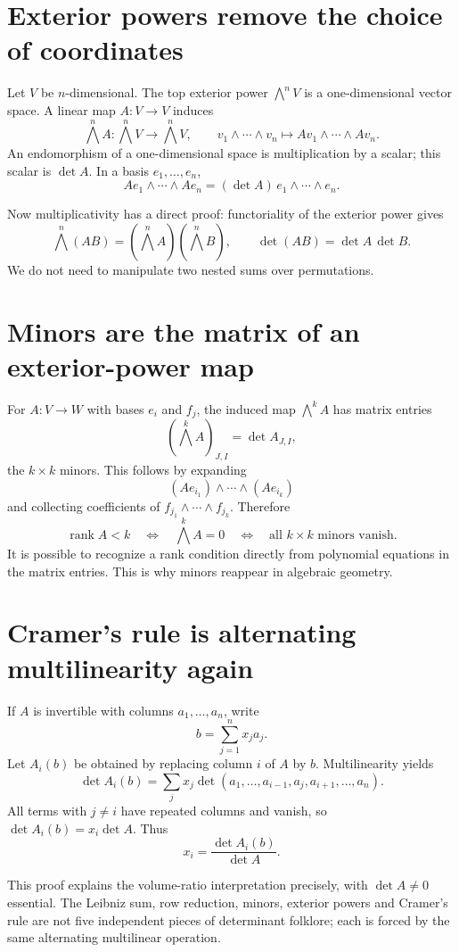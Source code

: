 \section{Exterior powers remove the choice of coordinates}

Let \(V\) be \(n\)-dimensional. The top exterior power \(\bigwedge^nV\) is a one-dimensional vector space. A linear map \(A:V\to V\) induces
\[
 \bigwedge^nA:\bigwedge^nV\longrightarrow\bigwedge^nV,
 \qquad
 v_1\wedge\cdots\wedge v_n\mapsto
 Av_1\wedge\cdots\wedge Av_n.
\]
An endomorphism of a one-dimensional space is multiplication by a scalar; this scalar is \(\det A\). In a basis \(e_1,\ldots,e_n\),
\[
 Ae_1\wedge\cdots\wedge Ae_n
 =(\det A)\,e_1\wedge\cdots\wedge e_n.
\]

Now multiplicativity has a direct proof: functoriality of the exterior power gives
\[
 \bigwedge^n(AB)=(\bigwedge^nA)(\bigwedge^nB),
 \qquad \det(AB)=\det A\,\det B.
\]
We do not need to manipulate two nested sums over permutations.

\section{Minors are the matrix of an exterior-power map}

For \(A:V\to W\) with bases \(e_i\) and \(f_j\), the induced map \(\bigwedge^k A\) has matrix entries
\[
 (\bigwedge^k A)_{J,I}=\det A_{J,I},
\]
the \(k\times k\) minors. This follows by expanding
\[
 (Ae_{i_1})\wedge\cdots\wedge(Ae_{i_k})
\]
and collecting coefficients of \(f_{j_1}\wedge\cdots\wedge f_{j_k}\). Therefore
\[
 \operatorname{rank}A<k
 \quad\Longleftrightarrow\quad \bigwedge^k A=0
 \quad\Longleftrightarrow\quad
 \text{all \(k\times k\) minors vanish}.
\]
It is possible to recognize a rank condition directly from polynomial equations in the matrix entries. This is why minors reappear in algebraic geometry.

\section{Cramer's rule is alternating multilinearity again}

If \(A\) is invertible with columns \(a_1,\ldots,a_n\), write
\[
 b=\sum_{j=1}^n x_ja_j.
\]
Let \(A_i(b)\) be obtained by replacing column \(i\) of \(A\) by \(b\). Multilinearity yields
\[
 \det A_i(b)=\sum_j x_j\det(a_1,\ldots,a_{i-1},a_j,a_{i+1},\ldots,a_n).
\]
All terms with \(j\ne i\) have repeated columns and vanish, so \(\det A_i(b)=x_i\det A\). Thus
\[
 x_i=\frac{\det A_i(b)}{\det A}.
\]

This proof explains the volume-ratio interpretation precisely, with \(\det A\ne0\) essential. The Leibniz sum, row reduction, minors, exterior powers and Cramer's rule are not five independent pieces of determinant folklore; each is forced by the same alternating multilinear operation.
